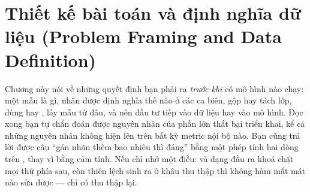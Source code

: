 \documentclass[../../deep_learning.tex]{subfiles}
\begin{document}
\chapter{Thiết kế bài toán và định nghĩa dữ liệu (Problem Framing and Data Definition)}

\begin{tomtat}
Chương này nói về những quyết định bạn phải ra \emph{trước khi} có mô hình nào chạy: một mẫu là gì, nhãn được định nghĩa thế nào ở các ca biên, gộp hay tách lớp, dùng  hay , lấy mẫu từ đâu, và nên đầu tư tiếp vào dữ liệu hay vào mô hình. Đọc xong bạn tự chẩn đoán được nguyên nhân của phần lớn thất bại triển khai, kể cả những nguyên nhân không hiện lên trên bất kỳ metric nội bộ nào. Bạn cũng trả lời được câu ``gán nhãn thêm bao nhiêu thì đáng'' bằng một phép tính hai dòng trên , thay vì bằng cảm tính. Nếu chỉ nhớ một điều:  và dạng đầu ra khoá chặt mọi thứ phía sau, còn thiên lệch sinh ra ở khâu thu thập thì không hàm mất mát nào sửa được --- chỉ có thu thập lại.
\end{tomtat}
\end{document}
